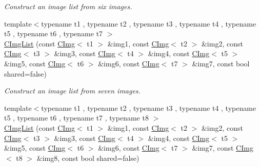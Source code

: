\begin{DoxyCompactItemize}
\begin{DoxyCompactList}\small\item\em Construct an image list from six images. \item\end{DoxyCompactList}\item 
\hypertarget{structcimg__library_1_1CImgList_a3799e0732dfa0af77707e9db6fd7d4eb}{
{\footnotesize template$<$typename t1 , typename t2 , typename t3 , typename t4 , typename t5 , typename t6 , typename t7 $>$ }\\\hyperlink{structcimg__library_1_1CImgList_a3799e0732dfa0af77707e9db6fd7d4eb}{CImgList} (const \hyperlink{structcimg__library_1_1CImg}{CImg}$<$ t1 $>$ \&img1, const \hyperlink{structcimg__library_1_1CImg}{CImg}$<$ t2 $>$ \&img2, const \hyperlink{structcimg__library_1_1CImg}{CImg}$<$ t3 $>$ \&img3, const \hyperlink{structcimg__library_1_1CImg}{CImg}$<$ t4 $>$ \&img4, const \hyperlink{structcimg__library_1_1CImg}{CImg}$<$ t5 $>$ \&img5, const \hyperlink{structcimg__library_1_1CImg}{CImg}$<$ t6 $>$ \&img6, const \hyperlink{structcimg__library_1_1CImg}{CImg}$<$ t7 $>$ \&img7, const bool shared=false)}
\label{structcimg__library_1_1CImgList_a3799e0732dfa0af77707e9db6fd7d4eb}

\begin{DoxyCompactList}\small\item\em Construct an image list from seven images. \item\end{DoxyCompactList}\item 
\hypertarget{structcimg__library_1_1CImgList_af92ee6bae27d0a19c27a7bb0bef8fc23}{
{\footnotesize template$<$typename t1 , typename t2 , typename t3 , typename t4 , typename t5 , typename t6 , typename t7 , typename t8 $>$ }\\\hyperlink{structcimg__library_1_1CImgList_af92ee6bae27d0a19c27a7bb0bef8fc23}{CImgList} (const \hyperlink{structcimg__library_1_1CImg}{CImg}$<$ t1 $>$ \&img1, const \hyperlink{structcimg__library_1_1CImg}{CImg}$<$ t2 $>$ \&img2, const \hyperlink{structcimg__library_1_1CImg}{CImg}$<$ t3 $>$ \&img3, const \hyperlink{structcimg__library_1_1CImg}{CImg}$<$ t4 $>$ \&img4, const \hyperlink{structcimg__library_1_1CImg}{CImg}$<$ t5 $>$ \&img5, const \hyperlink{structcimg__library_1_1CImg}{CImg}$<$ t6 $>$ \&img6, const \hyperlink{structcimg__library_1_1CImg}{CImg}$<$ t7 $>$ \&img7, const \hyperlink{structcimg__library_1_1CImg}{CImg}$<$ t8 $>$ \&img8, const bool shared=false)}
\label{structcimg__library_1_1CImgList_af92ee6bae27d0a19c27a7bb0bef8fc23}


\end{DoxyCompactItemize}
